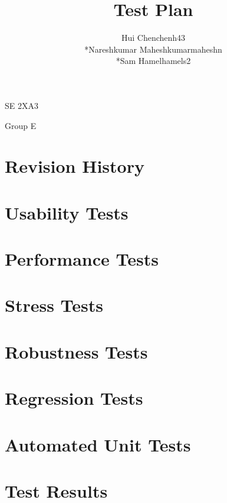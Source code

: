 \documentclass[11pt]{article}
\begin{document}
	\begin{titlepage}
	\title {Test Plan}
	\maketitle
		\begin{center}
		SE 2XA3\\
		\author{
		Hui Chen\hspace{128pt}chenh43	
		\\*Nareshkumar Maheshkumar\hspace{35pt}maheshn 
		\\*Sam Hamel\hspace{118pt}hamels2 \\
		}

		Group E
		\end{center}
	\end{titlepage}
	
	\newpage
	\tableofcontents
	\listoftables
	\newpage
	\section{Revision History}
	\section{Usability Tests}
	\section{Performance Tests}
	\section{Stress Tests}
	\section{Robustness Tests}
	\section{Regression Tests}
	\section{Automated Unit Tests}	
	\section{Test Results}
		
\end{document}
